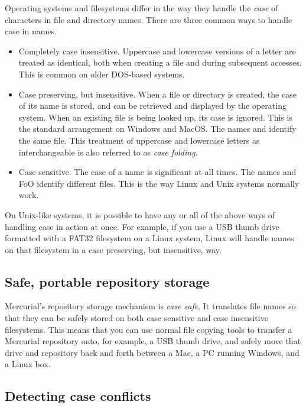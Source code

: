 Operating systems and filesystems differ in the way they handle the
\emph{case} of characters in file and directory names.  There are
three common ways to handle case in names.
\begin{itemize}
\item Completely case insensitive.  Uppercase and lowercase versions
  of a letter are treated as identical, both when creating a file and
  during subsequent accesses.  This is common on older DOS-based
  systems.
\item Case preserving, but insensitive.  When a file or directory is
  created, the case of its name is stored, and can be retrieved and
  displayed by the operating system.  When an existing file is being
  looked up, its case is ignored.  This is the standard arrangement on
  Windows and MacOS.  The names  and 
  identify the same file.  This treatment of uppercase and lowercase
  letters as interchangeable is also referred to as \emph{case folding}.
\item Case sensitive.  The case of a name is significant at all times.
  The names  and {FoO} identify different files.  This
  is the way Linux and Unix systems normally work.
\end{itemize}

On Unix-like systems, it is possible to have any or all of the above
ways of handling case in action at once.  For example, if you use a
USB thumb drive formatted with a FAT32 filesystem on a Linux system,
Linux will handle names on that filesystem in a case preserving, but
insensitive, way.

\subsection{Safe, portable repository storage}

Mercurial's repository storage mechanism is \emph{case safe}.  It
translates file names so that they can be safely stored on both case
sensitive and case insensitive filesystems.  This means that you can
use normal file copying tools to transfer a Mercurial repository onto,
for example, a USB thumb drive, and safely move that drive and
repository back and forth between a Mac, a PC running Windows, and a
Linux box.

\subsection{Detecting case conflicts}

